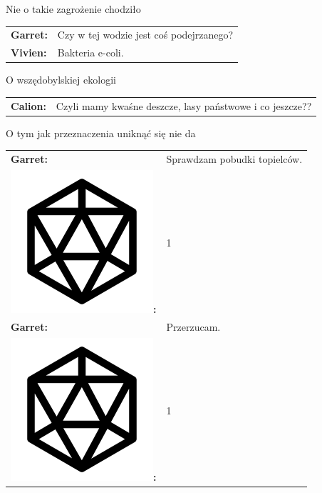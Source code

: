 \documentclass[10pt,twoside,twocolumn]{book}
\begin{document}
\begin{rpg-quotebox}{Nie o takie zagrożenie chodziło}
   \begin{tabularx}{\columnwidth}{lX}
      \textbf{Garret:} & Czy w tej wodzie jest coś podejrzanego?\\
      \textbf{Vivien:} & Bakteria e-coli.\\
   \end{tabularx}
\end{rpg-quotebox}

\begin{rpg-quotebox}{O wszędobylskiej ekologii}
   \begin{tabularx}{\columnwidth}{lX}
      \textbf{Calion:} & Czyli mamy kwaśne deszcze, lasy państwowe i co jeszcze??\\
   \end{tabularx}
\end{rpg-quotebox}

\begin{rpg-quotebox}{O tym jak przeznaczenia uniknąć się nie da}
   \begin{tabularx}{\columnwidth}{lX}
      \textbf{Garret:} &  Sprawdzam pobudki topielców.\\
      \includegraphics[scale=0.06]{img/d20.png}\textbf{:}& 1\\
      \textbf{Garret:} &  Przerzucam.\\
      \includegraphics[scale=0.06]{img/d20.png}\textbf{:}& 1\\
   \end{tabularx}
\end{rpg-quotebox}
\end{document}
